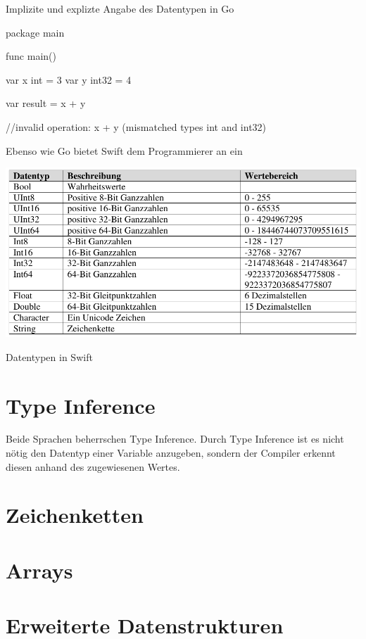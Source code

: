 \begin{listing}[H]
\caption{Implizite und explizte Angabe des Datentypen in Go}
\label{lst:VariablenGo}
\begin{GoCode}
package main

func main() {
    var x int = 3
    var y int32 = 4

    var result = x + y	
}
//invalid operation: x + y (mismatched types int and int32)
\end{GoCode}
\end{listing}

Ebenso wie Go bietet Swift dem Programmierer an ein 

\begin{listing}[H]
\caption{}
\end{listing}

\begin{table}[H]
    \centering
    \includegraphics[width=\textwidth]{Tabellen/Datentypen_Swift.pdf}
    \caption{Datentypen in Swift}
    \label{tab:DatentypenSwift}
\end{table}

\section{Type Inference}
\label{sec:TypeInference}
Beide Sprachen beherrschen Type Inference. 
Durch Type Inference ist es nicht nötig den Datentyp einer Variable anzugeben, sondern der Compiler erkennt diesen anhand des zugewiesenen Wertes. \cite[S.307]{Hinzberg.2015}

\section{Zeichenketten}

\section{Arrays}

\section{Erweiterte Datenstrukturen}


